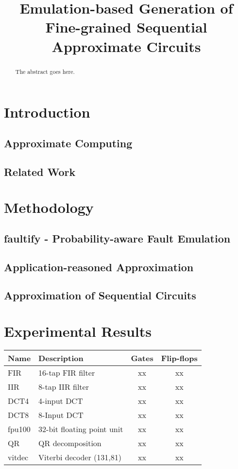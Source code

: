 \documentclass[conference]{IEEEtran}
\begin{document}
\title{Emulation-based Generation of Fine-grained Sequential Approximate Circuits }


\author{
\IEEEauthorblockA{}
\and
{}
\IEEEauthorblockA{}
}


\maketitle


\begin{abstract}
The abstract goes here.
\end{abstract}

\IEEEpeerreviewmaketitle



\section{Introduction}
\subsection{Approximate Computing}
\subsection{Related Work}

\section{Methodology}
\subsection{faultify - Probability-aware Fault Emulation}
\subsection{Application-reasoned Approximation }
\subsection{Approximation of Sequential Circuits}

\section{Experimental Results}
\begin{tabular} {| l | l | c | c |}
\hline
Name & Description & Gates & Flip-flops \\
\hline\hline
FIR & 16-tap FIR filter & xx & xx \\
IIR & 8-tap IIR filter & xx &xx \\
DCT4 & 4-input DCT & xx & xx \\
DCT8 & 8-Input DCT & xx & xx \\
fpu100 & 32-bit floating point unit & xx & xx \\
QR & QR decomposition & xx & xx \\
vitdec & Viterbi decoder (131,81) & xx & xx \\
\hline
\end{tabular}
\end{document}
